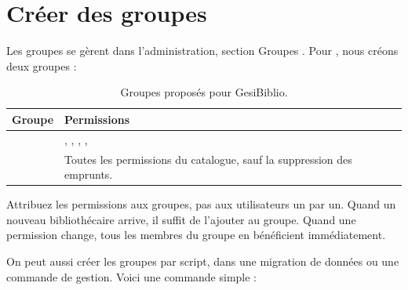 \section{Créer des groupes}

Les groupes se gèrent dans l'administration, section \og Groupes \fg. Pour
\gesibiblio, nous créons deux groupes :

\begin{table}[htbp]
\centering
\small
\begin{tabularx}{\textwidth}{L{4.1cm} X}
\toprule
\textbf{Groupe} & \textbf{Permissions} \\
\midrule
{} & , ,
, ,  \\
 & Toutes les permissions du catalogue, sauf la suppression
des emprunts. \\
\bottomrule
\end{tabularx}
\caption{Groupes proposés pour GesiBiblio.}
\end{table}

\begin{bonne}
Attribuez les permissions aux groupes, pas aux utilisateurs un par un. Quand un
nouveau bibliothécaire arrive, il suffit de l'ajouter au groupe. Quand une
permission change, tous les membres du groupe en bénéficient immédiatement.
\end{bonne}

On peut aussi créer les groupes par script, dans une migration de données ou une
commande de gestion. Voici une commande simple :

